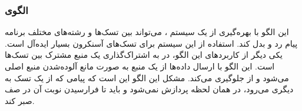 \subsubsection{الگوی }
\label{scheduleQueuingSec}
\begin{RTL}
این الگو با بهره‌گیری از یک سیستم ، می‌تواند بین تسک‌ها و رشته‌های
مختلف برنامه پیام رد و بدل کند. استفاده از این سیستم برای تسک‌های آسنکرون
بسیار ایده‌آل است. یکی دیگر از کاربردهای این الگو، در به اشتراک‌گذاری یک
منبع مشترک بین تسک‌ها است. این الگو با ارسال داده‌ها از یک منبع به صورت
 مانع آلوده‌شدن منبع اصلی می‌شود و از 
جلوگیری می‌کند. مشکل این الگو این است که پیامی که از یک تسک به دیگری
می‌رود، در همان لحظه پردازش نمی‌شود و باید تا فرارسیدن نوبت آن در صف
صبر کند.
\end{RTL}
